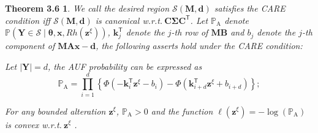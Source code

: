 \documentclass{article}
\theoremstyle{plain}
\newtheorem*{theorem35}{Theorem 3.6}
\theoremstyle{definition}
\def \x {\mathbf{x}}
\def \M {\mathbf{M}}
\def \A {\mathbf{A}}
\def \Y{\mathbf{Y}}
\def \wrt {\textit{w.r.t.}$\ $}
\def \x {\mathbf{x}}
\def \sS {\mathcal{S}}
\def \Y {\mathbf{Y}}
\def \k {\mathbf{k}}
\def \M {\mathbf{M}}
\def \A {\mathbf{A}}
\def \B {\mathbf{B}}
\def \C {\mathbf{C}}
\def \z {\mathbf{z}}
\def \d {\mathbf{d}}
\begin{document}
\begin{theorem35}
  We call the desired region $\sS(\M, \d)$ satisfies the CARE condition iff $\sS(\M, \d)$ is canonical \wrt $\C\bm{\Sigma}\C^\mathsf{T}$. Let $\mathbb{P}_{\operatorname*{A}}$ denote $\mathbb{P}(\Y \in \sS\mid \bm{\theta}, \x, Rh(\z^\xi))$, $\k_j^\mathsf{T}$ denote the $j$-th row of $\M\B$ and $b_j$ denote the $j$-th component of $\M\A\x-\d$, the following asserts hold under the CARE condition:
  \vspace{-0.05in}
  \begin{compactenum}
    \item Let $|\Y|=d$, the AUF probability can be expressed as
    \vspace{-0.1in}
    \begin{equation*}
      \mathbb{P}_{\operatorname*{A}} = \prod_{i=1}^{d}\left\{\Phi\left(-\k_i^\mathsf{T} \z^\xi - b_i\right) - \Phi\left(\k^\mathsf{T}_{i+d} \z^\xi + b_{i+d}\right)\right\};
    \end{equation*}
    \vspace{-0.17in}
    \item For any bounded alteration $\z^\xi$, $\mathbb{P}_{\operatorname*{A}}>0$ and the function $\ell\left(\z^\xi\right) = -\log\left(\mathbb{P}_{\operatorname*{A}}\right)$ is convex \wrt $\z^\xi$ .
  \end{compactenum}
\end{theorem35}
\end{document}
